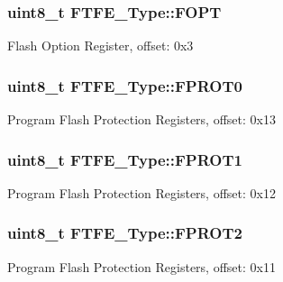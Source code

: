 \subsubsection[{\texorpdfstring{F\+O\+PT}{FOPT}}]{ uint8\+\_\+t F\+T\+F\+E\+\_\+\+Type\+::\+F\+O\+PT}\hypertarget{structFTFE__Type_ac099943969dd6ce0d003e6f5fc7239da}{}\label{structFTFE__Type_ac099943969dd6ce0d003e6f5fc7239da}
Flash Option Register, offset\+: 0x3 
\subsubsection[{\texorpdfstring{F\+P\+R\+O\+T0}{FPROT0}}]{ uint8\+\_\+t F\+T\+F\+E\+\_\+\+Type\+::\+F\+P\+R\+O\+T0}\hypertarget{structFTFE__Type_accda737cf6d9f44f59a8974c80c1567a}{}\label{structFTFE__Type_accda737cf6d9f44f59a8974c80c1567a}
Program Flash Protection Registers, offset\+: 0x13 
\subsubsection[{\texorpdfstring{F\+P\+R\+O\+T1}{FPROT1}}]{ uint8\+\_\+t F\+T\+F\+E\+\_\+\+Type\+::\+F\+P\+R\+O\+T1}\hypertarget{structFTFE__Type_afb29f340d9bb1c868c0fac324f375a96}{}\label{structFTFE__Type_afb29f340d9bb1c868c0fac324f375a96}
Program Flash Protection Registers, offset\+: 0x12 
\subsubsection[{\texorpdfstring{F\+P\+R\+O\+T2}{FPROT2}}]{ uint8\+\_\+t F\+T\+F\+E\+\_\+\+Type\+::\+F\+P\+R\+O\+T2}\hypertarget{structFTFE__Type_a1b8724e18379fd406b7635898725b4e1}{}\label{structFTFE__Type_a1b8724e18379fd406b7635898725b4e1}
Program Flash Protection Registers, offset\+: 0x11 
